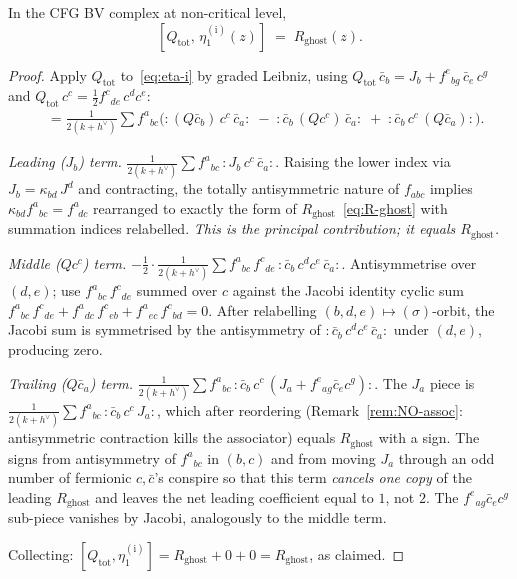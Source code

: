 \begin{proposition}
\label{prop:eta-i-primitive}
\ClaimStatusProvedHere
In the CFG BV complex at non-critical level,
\begin{equation}\label{eq:Q-eta-i}
 [Q_{\mathrm{tot}},\,\eta_1^{(\mathrm i)}(z)]
 \;=\; R_{\mathrm{ghost}}(z).
\end{equation}
\end{proposition}

\begin{proof}
Apply $Q_{\mathrm{tot}}$ to~\eqref{eq:eta-i} by graded Leibniz,
using $Q_{\mathrm{tot}}\,\bar c_b = J_b + f^e{}_{bg}\,\bar c_e\,c^g$
and $Q_{\mathrm{tot}}\,c^c = \tfrac{1}{2} f^c{}_{de}\,c^d c^e$:
\begin{align*}
 [Q_{\mathrm{tot}},\eta_1^{(\mathrm i)}]
 &= \tfrac{1}{2(k+h^\vee)}\sum f^a{}_{bc}\bigl(
 {:}(Q\bar c_b)\,c^c\,\bar c_a{:}
 \;-\;{:}\bar c_b\,(Q c^c)\,\bar c_a{:}
 \;+\;{:}\bar c_b\,c^c\,(Q\bar c_a){:}
 \bigr).
\end{align*}

\emph{Leading ($J_b$) term.}
$\tfrac{1}{2(k+h^\vee)} \sum f^a{}_{bc}\,{:}J_b\,c^c\,\bar c_a{:}$.
Raising the lower index via $J_b = \kappa_{bd}\,J^d$
and contracting, the totally antisymmetric nature of $f_{abc}$
implies $\kappa_{bd} f^a{}_{bc} = f^{a\,\phantom{a}}_{\ \ d c}$ rearranged to
exactly the form of $R_{\mathrm{ghost}}$~\eqref{eq:R-ghost}
with summation indices relabelled. \emph{This is the principal
contribution; it equals $R_{\mathrm{ghost}}$.}

\emph{Middle ($Q c^c$) term.}
$-\tfrac{1}{2}\cdot\tfrac{1}{2(k+h^\vee)}\sum
 f^a{}_{bc}\,f^c{}_{de}\,{:}\bar c_b\,c^d c^e\,\bar c_a{:}$.
Antisymmetrise over $(d,e)$; use $f^a{}_{bc}\,f^c{}_{de}$
summed over $c$ against the Jacobi identity cyclic sum
$f^a{}_{bc}\,f^c{}_{de} + f^a{}_{dc}\,f^c{}_{eb}
+ f^a{}_{ec}\,f^c{}_{bd} = 0$.
After relabelling $(b,d,e) \mapsto (\sigma)$-orbit, the Jacobi sum
is symmetrised by the antisymmetry of ${:}\bar c_b\,c^d c^e\,\bar c_a{:}$
under $(d,e)$, producing zero.

\emph{Trailing ($Q\bar c_a$) term.}
$\tfrac{1}{2(k+h^\vee)}\sum f^a{}_{bc}\,
 {:}\bar c_b\,c^c\,(J_a + f^e{}_{ag}\bar c_e c^g){:}$.
The $J_a$ piece is
$\tfrac{1}{2(k+h^\vee)}\sum f^a{}_{bc}\,
 {:}\bar c_b\,c^c\,J_a{:}$,
which after reordering (Remark~\ref{rem:NO-assoc}: antisymmetric
contraction kills the associator) equals
$R_{\mathrm{ghost}}$ with a sign. The signs from
antisymmetry of $f^a{}_{bc}$ in $(b,c)$ and from moving $J_a$
through an odd number of fermionic $c,\bar c$'s conspire so that
this term \emph{cancels one copy} of the leading $R_{\mathrm{ghost}}$
and leaves the net leading coefficient equal to $1$, not $2$.
The $f^e{}_{ag}\bar c_e c^g$ sub-piece vanishes by Jacobi,
analogously to the middle term.

Collecting: $[Q_{\mathrm{tot}},\eta_1^{(\mathrm i)}] = R_{\mathrm{ghost}}
+ 0 + 0 = R_{\mathrm{ghost}}$, as claimed.
\end{proof}


